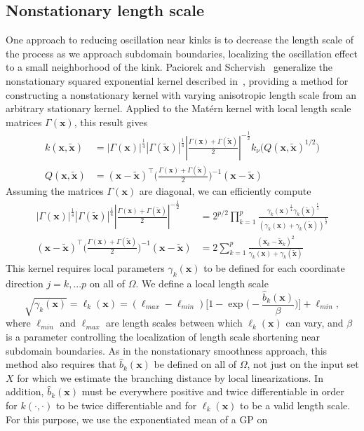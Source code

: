 \documentclass{article}
\newcommand{\abs}[1]{\left|#1\right|}
\renewcommand{\vec}[1]{\mathbf{#1}}
\numberwithin{equation}{section}
\begin{document}
\subsection{Nonstationary length scale}
One approach to reducing oscillation near kinks is to decrease the length scale of the process as we approach subdomain boundaries, localizing the oscillation effect to a small neighborhood of the kink. Paciorek and Schervish~\cite{paciorek2004nonstationary} generalize the nonstationary squared exponential kernel described in~\cite{gibbs1998bayesian}, providing a method for constructing a nonstationary kernel with varying anisotropic length scale from an arbitrary stationary kernel. Applied to the Mat\'ern kernel with local length scale matrices $\Gamma(\vec{x})$, this result gives
\begin{align*}
  k(\vec{x}, \tilde{\vec{x}})
  & = |\Gamma(\vec{x})|^{\frac{1}{4}} |\Gamma(\tilde{\vec{x}})|^{\frac{1}{4}} \abs{\frac{\Gamma(\vec{x}) + \Gamma(\tilde{\vec{x}})}{2}}^{-\frac{1}{2}}
  k_\nu \Big(Q(\vec{x}, \tilde{\vec{x}})^{1/2}\Big) \\
  Q(\vec{x}, \tilde{\vec{x}}) & = (\vec{x} - \tilde{\vec{x}})^\top \Big(\frac{\Gamma(\vec{x}) + \Gamma(\tilde{\vec{x}})}{2}\Big)^{-1} (\vec{x} - \tilde{\vec{x}})
\end{align*}
Assuming the matrices $\Gamma(\vec{x})$ are diagonal, we can efficiently compute
\begin{align*}
   |\Gamma(\vec{x})|^{\frac{1}{4}} |\Gamma(\tilde{\vec{x}})|^{\frac{1}{4}} \abs{\frac{\Gamma(\vec{x}) + \Gamma(\tilde{\vec{x}})}{2}}^{-\frac{1}{2}}
   & = 2^{p/2} \prod_{k=1}^p \frac{\gamma_k(\vec{x})^\frac{1}{4} \gamma_k(\tilde{\vec{x}})^\frac{1}{4}}{(\gamma_k(\vec{x}) + \gamma_k(\tilde{\vec{x}}))^\frac{1}{2}} \\
   (\vec{x} - \tilde{\vec{x}})^\top \Big(\frac{\Gamma(\vec{x}) + \Gamma(\tilde{\vec{x}})}{2}\Big)^{-1} (\vec{x} - \tilde{\vec{x}})
   & = 2 \sum_{k=1}^p \frac{(\vec{x}_k - \tilde{\vec{x}}_k)^2}{\gamma_k(\vec{x}) + \gamma_k(\tilde{\vec{x}})}
\end{align*}
This kernel requires local parameters
$\gamma_k(\vec{x})$ to be defined for each coordinate direction $j=k,...p$ on all of $\Omega$. We define a local length scale
\begin{equation}
  \sqrt{\gamma_k(\vec{x})} = \ell_k(\vec{x}) = (\ell_{max} - \ell_{min}) \bigg[1 - \exp\bigg(-\frac{\hat{b}_k(\vec{x})}{\beta}\bigg)\bigg] + \ell_{min}, \label{eq:length}
\end{equation}
where $\ell_{min}$ and $\ell_{max}$ are length scales between which $\ell_k(\vec{x})$ can vary, and $\beta$ is a parameter controlling the localization of length scale shortening near subdomain boundaries. As in the nonstationary smoothness approach, this method also requires that $\hat{b}_k(\vec{x})$ be defined on all of $\Omega$, not just on the input set $X$ for which we estimate the branching distance by local linearizations. In addition, $\hat{b}_k(\vec{x})$ must be everywhere positive and twice differentiable in order for $k(\cdot, \cdot)$ to be twice differentiable and for $\ell_k(\vec{x})$ to be a valid length scale. For this purpose, we use the exponentiated mean of a GP on
\end{document}
